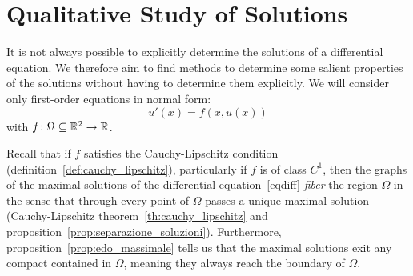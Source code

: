 \section{Qualitative Study of Solutions}
\label{sec:studio_qualitativo_edo}

It is not always possible to explicitly determine the solutions of a
differential equation. We therefore aim to find methods to determine some
salient properties of the solutions without having to determine them explicitly.
We will consider only first-order equations in normal form:
\begin{equation}\label{eqdiff}
	u'(x)= f(x,u(x))
\end{equation}
with $f\colon \Omega \subseteq {\mathbb R}^2\to {\mathbb R}$.

Recall that if $f$ satisfies the Cauchy-Lipschitz condition
(definition~\ref{def:cauchy_lipschitz}), particularly if $f$ is of class $C^1$,
then the graphs of the maximal solutions of the differential
equation~\eqref{eqdiff} \emph{fiber} the region $\Omega$ in the sense that
through every point of $\Omega$ passes a unique maximal solution
(Cauchy-Lipschitz theorem~\ref{th:cauchy_lipschitz} and
proposition~\ref{prop:separazione_soluzioni}). Furthermore,
proposition~\ref{prop:edo_massimale} tells us that the maximal solutions exit
any compact contained in $\Omega$, meaning they always reach the boundary of
$\Omega$.

